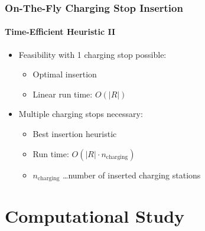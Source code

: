 \documentclass[aspectratio=1610]{beamer}
\newcommand{\important}[1]{{\color{green!60!black}#1}}
\let\oldfootnotesize\footnotesize
\renewcommand*{\footnotesize}{\oldfootnotesize\fontsize{6}{4}\selectfont}
\renewcommand{\footnotesize}{\scriptsize}
\begin{document}
\begin{frame}
  \frametitle{On-The-Fly Charging Stop Insertion}
  \framesubtitle{Time-Efficient Heuristic II}
  
\begin{itemize}
	\item Feasibility with 1 charging stop possible:
	\smallskip
		\begin{itemize}
			\item Optimal insertion
			\smallskip
			\item Linear run time: $O(|R|)$
		\end{itemize}
	\bigskip
	\item Multiple charging stops necessary: 
	\smallskip
		\begin{itemize}
			\item Best insertion heuristic %
			\smallskip
			\item Run time: $O(|R| \cdot n_{\mathrm{charging}})$ 
			\smallskip
			\item $n_{\mathrm{charging}}$ \dots number of inserted charging stations 
		\end{itemize}
\end{itemize}

%

\end{frame}



\section{Computational Study}
\end{document}
